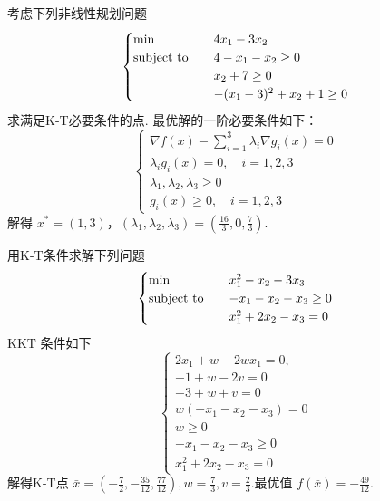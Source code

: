 \begin{problem}[P243 3]
    考虑下列非线性规划问题 
    \[\begin{cases}
        \min \quad &4x_1 - 3x_2\\
        \operatorname{subject\ to} \quad &4 - x_1 - x_2 \ge 0\\
        &x_2 + 7 \ge 0\\
        &-(x_1 - 3)^2 + x_2 + 1 \ge 0
    \end{cases}\]
    求满足K-T必要条件的点.
    \Answer 最优解的一阶必要条件如下：\[\begin{cases}
        \nabla f(x) - \sum_{i = 1}^3\lambda_i \nabla g_i(x) = 0\\
        \lambda_i g_i(x) = 0, \quad i = 1, 2, 3\\
        \lambda_1, \lambda_2, \lambda_3 \ge 0\\
        g_i(x) \ge 0, \quad i = 1, 2, 3
    \end{cases}\]
    解得 $x^* = (1, 3)$，$(\lambda_1, \lambda_2, \lambda_3) = (\frac{16}{3}, 0, \frac{7}{3})$.
\end{problem}

\begin{problem}[P243 5]
    用K-T条件求解下列问题
    \[\begin{cases}
        \min \quad &x_1^2 - x_2 - 3x_3\\
        \operatorname{subject\ to} \quad &-x_1 - x_2 - x_3 \ge 0\\
        &x_1^2 + 2x_2 - x_3 = 0
    \end{cases}\]
    \Answer KKT 条件如下\[\begin{cases}
        2 x_{1}+w-2 w x_{1}=0, \\
        -1+w-2 v=0 \\
        -3+w+v=0 \\
        w\left(-x_{1}-x_{2}-x_{3}\right)=0 \\
        w \ge 0 \\
        -x_{1}-x_{2}-x_{3} \ge 0 \\
        x_{1}^{2}+2 x_{2}-x_{3}=0
    \end{cases}\]
    解得K-T点 $\bar{x} = (-\frac{7}{2}, -\frac{35}{12}, \frac{77}{12}), w = \frac{7}{3}, v = \frac{2}{3}$.最优值 $f(\bar{x}) = -\frac{49}{12}$.
\end{problem}

